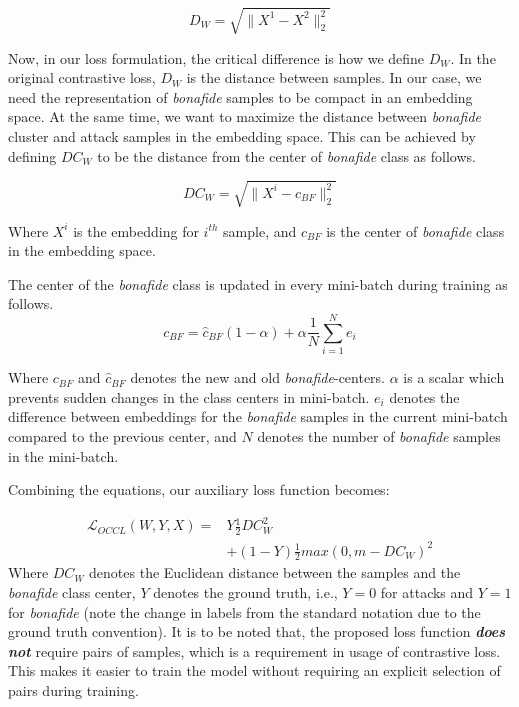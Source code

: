 \documentclass[journal]{IEEEtran}
\begin{document}
\begin{equation}
D_W=\sqrt{\|X^{1}-X^{2}\|_2^2}
\end{equation}

Now, in our loss formulation, the critical difference is how we define $D_W$. In the original contrastive loss, $D_W$ is the distance between samples. In our case, we need the representation of \textit{bonafide} samples to be compact in an embedding space. At the same time, we want to maximize the distance between \textit{bonafide} cluster and attack samples in the embedding space. This can be achieved by defining $DC_W$ to be the distance from the center of \textit{bonafide} class as follows.

\begin{equation}
DC_W=\sqrt{\|X^{i}-c_{BF}\|_2^2}
\end{equation}

Where $X^{i}$ is the embedding for $i^{th}$ sample, and $c_{BF}$ is the center of \textit{bonafide} class in the embedding space.

The center of the \textit{bonafide} class is updated in every mini-batch during training as follows.
\begin{equation}
c_{BF}= \hat{c}_{BF} (1-\alpha) + \alpha \frac{1}{N}\sum_{i=1}^{N}e_{i}
\end{equation}

Where $c_{BF}$ and $\hat{c}_{BF}$ denotes the new and old \textit{bonafide}-centers. $\alpha$ is a scalar which prevents sudden changes in the class centers in mini-batch.  $e_{i}$ denotes the difference between embeddings for the \textit{bonafide} samples in the current mini-batch compared to the previous center, and $N$ denotes the number of \textit{bonafide} samples in the mini-batch.

Combining the equations, our auxiliary loss function becomes:

\begin{equation}
\begin{split}
\mathcal{L}_{OCCL}(W, Y, X)=  & Y\frac{1}{2}DC_W^{2} \\
            & + (1-Y)\frac{1}{2}{max(0, m-DC_W)}^{2}
\end{split}
\end{equation}
Where $DC_W$ denotes the Euclidean distance between the samples and the \textit{bonafide} class center, $Y$ denotes the ground truth, i.e., $Y=0$ for attacks and $Y=1$ for \textit{bonafide} (note the change in labels from the standard notation due to the ground truth convention). It is to be noted that, the proposed loss function \textit{\textbf{does not}} require pairs of samples, which is a requirement in usage of contrastive loss. This makes it easier to train the model without requiring an explicit selection of pairs during training.
\end{document}
